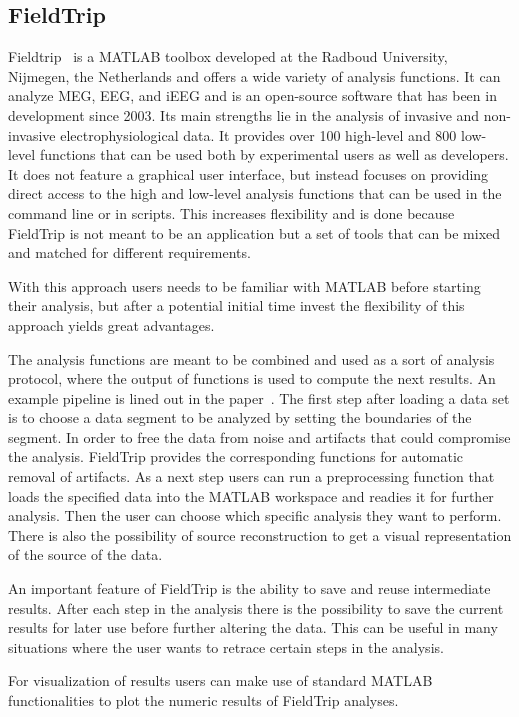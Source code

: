 \subsection{FieldTrip}
Fieldtrip~\cite{fieldtrip} is a MATLAB toolbox developed at the Radboud University,  Nijmegen,  the Netherlands and offers a wide variety of analysis functions.  It can analyze MEG, EEG, and iEEG and is an open-source software that has been in development since 2003. Its main strengths lie in the analysis of invasive and non-invasive electrophysiological data. It provides over 100 high-level and 800 low-level functions that can be used both by experimental users as well as developers. It does not feature a graphical user interface, but instead focuses on providing direct access to the high and low-level analysis functions that can be used in the command line or in scripts.  This increases flexibility and is done because FieldTrip is not meant to be an application but a set of tools that can be mixed and matched for different requirements.

With this approach users needs to be familiar with MATLAB before starting their analysis, but after a potential initial time invest the flexibility of this approach yields great advantages.

The analysis functions are meant to be combined and used as a sort of analysis protocol, where the output of functions is used to compute the next results. 
An example pipeline is lined out in the paper~\cite{fieldtrip}. The first step after loading a data set is to choose a data segment to be analyzed by setting the boundaries of the segment. In order to free the data from noise and artifacts that could compromise the analysis. FieldTrip provides the corresponding functions for automatic removal of artifacts. As a next step users can run a preprocessing function that loads the specified data into the MATLAB workspace and readies it for further analysis. Then the user can choose which specific analysis they want to perform. There is also the possibility of source reconstruction to get a visual representation of the source of the data.

An important feature of FieldTrip is the ability to save and reuse intermediate results. After each step in the analysis there is the possibility to save the current results for later use before further altering the data. This can be useful in many situations where the user wants to retrace certain steps in the analysis.

For visualization of results users can make use of standard MATLAB functionalities to plot the numeric results of FieldTrip analyses.

